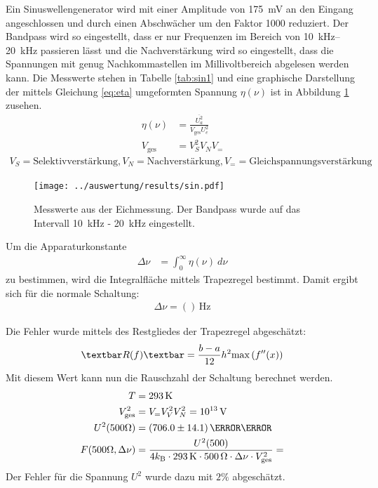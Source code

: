 Ein Sinuswellengenerator wird mit einer Amplitude von \SI{175}{\milli\volt} an den Eingang angeschlossen und durch einen Abschwächer um den Faktor 1000 reduziert. Der Bandpass wird so eingestellt, dass er nur Frequenzen im Bereich von \SIrange{10}{20}{\kilo\hertz} passieren lässt und die Nachverstärkung wird so eingestellt, dass die Spannungen mit genug Nachkommastellen im Millivoltbereich abgelesen werden kann. Die Messwerte stehen in Tabelle \ref{tab:sin1} und eine graphische Darstellung der mittels Gleichung \ref{eq:eta} umgeformten Spannung $\eta(\nu)$ ist in Abbildung \ref{fig:eichmessung} zusehen.
\begin{align}
	\eta(\nu) &= \frac{\overline{U^2_a}}{V_\text{ges}U^2_e}
	\label{eq:eta}\\
	V_\text{ges} &= V_S^2V_NV_=
\end{align}
\begin{align*}
	V_S = \text{Selektivverstärkung}, V_N = \text{Nachverstärkung}, V_==\text{Gleichspannungsverstärkung}
\end{align*}
\begin{figure}[h]
	\texttt{[image: ../auswertung/results/sin.pdf]}
	\caption{Messwerte aus der Eichmessung. Der Bandpass wurde auf das Intervall \SI{10}{\kilo\hertz} - \SI{20}{\kilo\hertz} eingestellt.}
	\label{fig:eichmessung}
\end{figure}


Um die Apparaturkonstante
\begin{align}
	\Delta\nu &= \int_0^\infty \eta(\nu)\ d\nu
\end{align}
zu bestimmen, wird die Integralfläche mittels Trapezregel bestimmt.
Damit ergibt sich für die normale Schaltung:
\begin{align}
\Delta\nu = ()\, \si{\hertz}
\end{align}

Die Fehler wurde mittels des Restgliedes der Trapezregel abgeschätzt:
\begin{align}
	\textbar R(f)\textbar = \frac{b-a}{12}h^2\text{max}\left(f''(x)\right)
	\label{eq:restglied}
\end{align}
Mit diesem Wert kann nun die Rauschzahl der Schaltung berechnet werden. 
\begin{align*}
	T &= \SI{293}{\kelvin}\\
	V^2_\text{ges} &= V_=V^2_VV^2_N = 10^{13}\, \si{\volt}\\
	U^2(500\Omega) &= (706.0\pm 14.1)\,{\milli\volt}\\
	F(500\Omega, \Delta\nu) &= \frac{U^2(500)}{4k_\text{B} \cdot \SI{293}{\kelvin} \cdot \SI{500}{\ohm} \cdot \Delta\nu \cdot V^2_\text{ges}} = 
\end{align*}
Der Fehler für die Spannung $U^2$ wurde dazu mit $2\%$ abgeschätzt.\\


